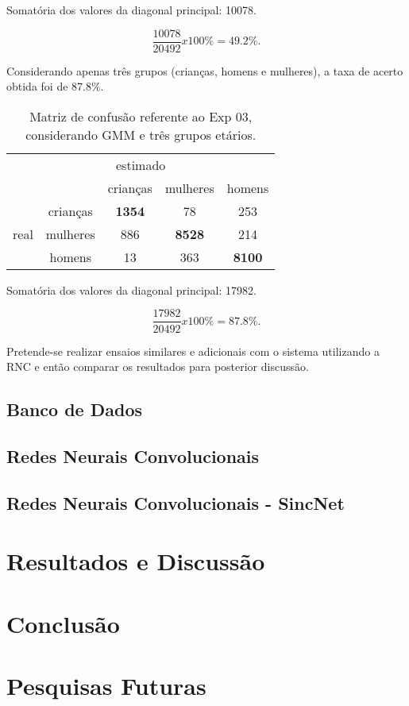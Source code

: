 Somatória dos valores da diagonal principal: 10078.

\[
    \frac{10078}{20492} x 100\% = 49.2\%
.\]

Considerando apenas três grupos (crianças, homens e mulheres), a taxa de acerto obtida foi de 87.8\%.

\begin{table}[!h]
\centering
\begin{tabular}{ c c | c c c }
\multicolumn{5}{c}{estimado} \\
 & & crianças & mulheres & homens \\
\hline
\multirow{3}{*}{real} & crianças & \textbf{1354} & 78 & 253\\
& mulheres & 886 & \textbf{8528} & 214 \\
& homens & 13 & 363 & \textbf{8100}
\end{tabular}
\caption{Matriz de confusão referente ao Exp 03, considerando GMM e três grupos etários.}
\end{table}
\FloatBarrier

Somatória dos valores da diagonal principal: 17982.

\[
    \frac{17982}{20492} x 100\% = 87.8\%
.\]

Pretende-se realizar ensaios similares e adicionais com o sistema utilizando a RNC e então comparar os resultados para posterior discussão. 


\section{Banco de Dados}
\section{Redes Neurais Convolucionais}
\section{Redes Neurais Convolucionais - SincNet}


\chapter{Resultados e Discussão}
\chapter{Conclusão}
\chapter{Pesquisas Futuras}

\printbibliography

\printindex


